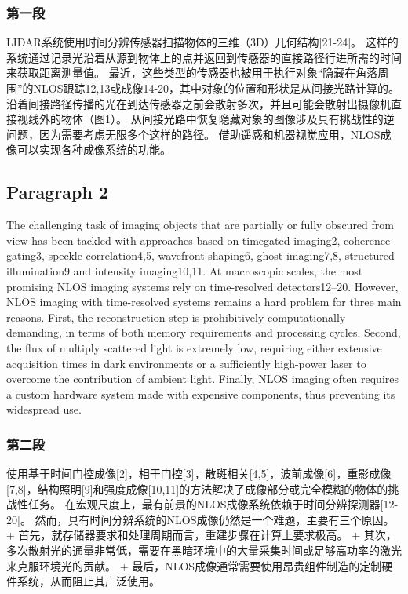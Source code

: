 \documentclass[11pt]{article}
\begin{document}
    \subsubsection{第一段}\label{ux7b2cux4e00ux6bb5}

LIDAR系统使用时间分辨传感器扫描物体的三维（3D）几何结构{[}21-24{]}。
这样的系统通过记录光沿着从源到物体上的点并返回到传感器的直接路径行进所需的时间来获取距离测量值。
最近，这些类型的传感器也被用于执行对象``隐藏在角落周围''的NLOS跟踪12,13或成像14-20，其中对象的位置和形状是从间接光路计算的。沿着间接路径传播的光在到达传感器之前会散射多次，并且可能会散射出摄像机直接视线外的物体（图1）。
从间接光路中恢复隐藏对象的图像涉及具有挑战性的逆问题，因为需要考虑无限多个这样的路径。
借助遥感和机器视觉应用，NLOS成像可以实现各种成像系统的功能。

    \subsection{Paragraph 2}\label{paragraph-2}

The challenging task of imaging objects that are partially or fully
obscured from view has been tackled with approaches based on timegated
imaging2, coherence gating3, speckle correlation4,5, wavefront shaping6,
ghost imaging7,8, structured illumination9 and intensity imaging10,11.
At macroscopic scales, the most promising NLOS imaging systems rely on
time-resolved detectors12--20. However, NLOS imaging with time-resolved
systems remains a hard problem for three main reasons. First, the
reconstruction step is prohibitively computationally demanding, in terms
of both memory requirements and processing cycles. Second, the flux of
multiply scattered light is extremely low, requiring either extensive
acquisition times in dark environments or a sufficiently high-power
laser to overcome the contribution of ambient light. Finally, NLOS
imaging often requires a custom hardware system made with expensive
components, thus preventing its widespread use.

    \subsubsection{第二段}\label{ux7b2cux4e8cux6bb5}

使用基于时间门控成像{[}2{]}，相干门控{[}3{]}，散斑相关{[}4,5{]}，波前成像{[}6{]}，重影成像{[}7,8{]}，结构照明{[}9{]}和强度成像{[}10,11{]}的方法解决了成像部分或完全模糊的物体的挑战性任务。
在宏观尺度上，最有前景的NLOS成像系统依赖于时间分辨探测器{[}12-20{]}。
然而，具有时间分辨系统的NLOS成像仍然是一个难题，主要有三个原因。 +
首先，就存储器要求和处理周期而言，重建步骤在计算上要求极高。 +
其次，多次散射光的通量非常低，需要在黑暗环境中的大量采集时间或足够高功率的激光来克服环境光的贡献。
+
最后，NLOS成像通常需要使用昂贵组件制造的定制硬件系统，从而阻止其广泛使用。
\end{document}
